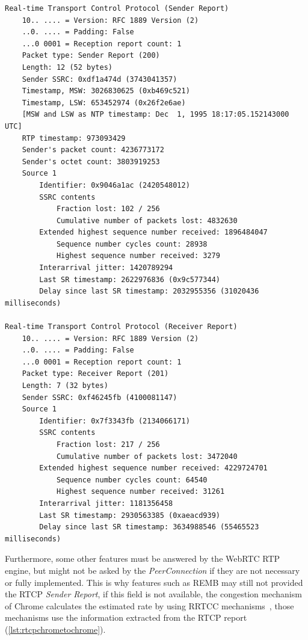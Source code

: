 \lstset{language=sh}
\begin{lstlisting}[caption={RTCP message exchange between Chrome and Firefox},label={lst:rtcpchrometochrome}]
Real-time Transport Control Protocol (Sender Report)
    10.. .... = Version: RFC 1889 Version (2)
    ..0. .... = Padding: False
    ...0 0001 = Reception report count: 1
    Packet type: Sender Report (200)
    Length: 12 (52 bytes)
    Sender SSRC: 0xdf1a474d (3743041357)
    Timestamp, MSW: 3026830625 (0xb469c521)
    Timestamp, LSW: 653452974 (0x26f2e6ae)
    [MSW and LSW as NTP timestamp: Dec  1, 1995 18:17:05.152143000 UTC]
    RTP timestamp: 973093429
    Sender's packet count: 4236773172
    Sender's octet count: 3803919253
    Source 1
        Identifier: 0x9046a1ac (2420548012)
        SSRC contents
            Fraction lost: 102 / 256
            Cumulative number of packets lost: 4832630
        Extended highest sequence number received: 1896484047
            Sequence number cycles count: 28938
            Highest sequence number received: 3279
        Interarrival jitter: 1420789294
        Last SR timestamp: 2622976836 (0x9c577344)
        Delay since last SR timestamp: 2032955356 (31020436 milliseconds)

Real-time Transport Control Protocol (Receiver Report)
    10.. .... = Version: RFC 1889 Version (2)
    ..0. .... = Padding: False
    ...0 0001 = Reception report count: 1
    Packet type: Receiver Report (201)
    Length: 7 (32 bytes)
    Sender SSRC: 0xf46245fb (4100081147)
    Source 1
        Identifier: 0x7f3343fb (2134066171)
        SSRC contents
            Fraction lost: 217 / 256
            Cumulative number of packets lost: 3472040
        Extended highest sequence number received: 4229724701
            Sequence number cycles count: 64540
            Highest sequence number received: 31261
        Interarrival jitter: 1181356458
        Last SR timestamp: 2930563385 (0xaeacd939)
        Delay since last SR timestamp: 3634988546 (55465523 milliseconds)
\end{lstlisting}

Furthermore, some other features must be answered by the WebRTC RTP engine, but might not be asked by the {\it PeerConnection} if they are not necessary or fully implemented. This is why features such as REMB may still not provided the RTCP {\it Sender Report}, if this field is not available, the congestion mechanism of Chrome calculates the estimated rate by using RRTCC mechanisms~\cite{alvestrandCongestion2012}, those mechanisms use the information extracted from the RTCP report (\ref{lst:rtcpchrometochrome}). 


